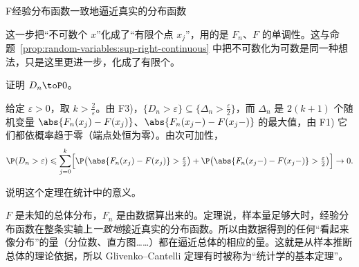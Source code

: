 \begin{probleme}{F}{经验分布函数一致地逼近真实的分布函数}
\begin{questions}
\begin{solution}
这一步把“不可数个 $x$”化成了“有限个点 $x_j$”，用的是 $F_n$、$F$ 的单调性。这与命题~\ref{prop:random-variables:sup-right-continuous} 中把不可数化为可数是同一种想法，只是这里更进一步，化成了有限个。
\end{solution}
\item 证明 $D_n\toP0$。
\begin{solution}
给定 $\varepsilon>0$，取 $k>\frac2\varepsilon$。由 F3)，$\{D_n>\varepsilon\}\subseteq\{\Delta_n>\frac\varepsilon2\}$，而 $\Delta_n$ 是 $2(k+1)$ 个随机变量 $\abs{F_n(x_j)-F(x_j)}$、$\abs{F_n(x_j-)-F(x_j-)}$ 的最大值，由 F1) 它们都依概率趋于零（端点处恒为零）。由次可加性，
\[
\P(D_n>\varepsilon)\leqslant\sum_{j=0}^k\Bigl[\P\bigl(\abs{F_n(x_j)-F(x_j)}>\tfrac\varepsilon2\bigr)+\P\bigl(\abs{F_n(x_j-)-F(x_j-)}>\tfrac\varepsilon2\bigr)\Bigr]\to0 .
\]
\end{solution}
\item 说明这个定理在统计中的意义。
\begin{solution}
$F$ 是未知的总体分布，$F_n$ 是由数据算出来的。定理说，样本量足够大时，经验分布函数在整条实轴上\emph{一致地}接近真实的分布函数。所以由数据得到的任何“看起来像分布”的量（分位数、直方图……）都在逼近总体的相应的量。这就是从样本推断总体的理论依据，所以 Glivenko--Cantelli 定理有时被称为“统计学的基本定理”。
\end{solution}
\end{questions}
\end{probleme}
